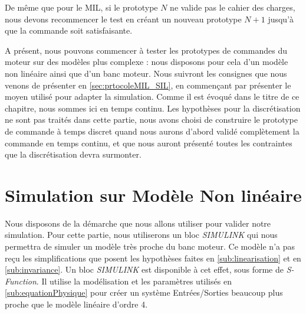 	De même que pour le MIL, si le prototype $N$ ne valide pas le cahier des charges, nous devons recommencer le test en créant un nouveau prototype $N+1$ jusqu'à que la commande soit satisfaisante. 
	\begin{center}
	A présent, nous pouvons commencer à tester les prototypes de commandes du moteur sur des modèles plus complexe : nous disposons pour cela d'un modèle non linéaire ainsi que d'un banc moteur. Nous suivront les consignes que nous venons de présenter en \ref{sec:prtocoleMIL_SIL}, en commençant par présenter le moyen utilisé pour adapter la simulation. 
	Comme il est évoqué dans le titre de ce chapitre, nous sommes ici en temps continu. Les hypothèses pour la discrétisation ne sont pas traités dans cette partie, nous avons choisi de construire le prototype de commande à temps discret quand nous aurons d'abord validé complètement la commande en temps continu, et que nous auront présenté toutes les contraintes que la discrétisation devra surmonter. 
	\end{center}
	\section{Simulation sur Modèle Non linéaire}
		
		Nous disposons de la démarche que nous allons utiliser pour valider notre simulation. Pour cette partie, nous utiliserons un bloc \emph{SIMULINK} qui nous permettra de simuler un modèle très proche du banc moteur. Ce modèle n'a pas reçu les simplifications que posent les hypothèses faites en \ref{sub:linearisation} et en \ref{sub:invariance}. Un bloc \emph{SIMULINK} est disponible à cet effet, sous forme de \emph{S-Function}. Il utilise la modélisation et les paramètres utilisés en \ref{sub:equationPhysique} pour créer un système Entrées/Sorties beaucoup plus proche que le modèle linéaire d'ordre 4. 
